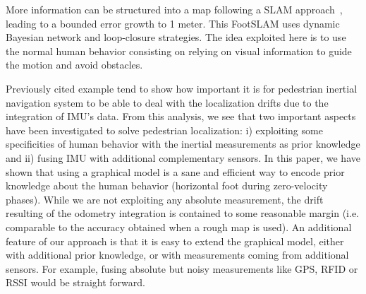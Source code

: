 More information can be structured into a map following a SLAM approach~\cite{angermann2012footslam}, leading to a bounded error growth to 1 meter. This FootSLAM uses dynamic Bayesian network and loop-closure strategies.
The idea exploited here is to use the normal human behavior 
consisting on relying on visual information to guide the motion and avoid obstacles.

Previously cited example tend to show how important it is for pedestrian inertial navigation system to be able to deal with the localization drifts due to the integration of IMU's data. 
From this analysis, we see that two important aspects have been investigated to solve pedestrian localization: i) exploiting some specificities of human behavior with the inertial measurements as prior knowledge and ii) fusing IMU with additional complementary sensors.
In this paper, we have shown that using a graphical model is a sane and efficient way to encode prior knowledge about the human behavior (horizontal foot during zero-velocity phases).
While we are not exploiting any absolute measurement, the drift resulting of the odometry integration is contained to some reasonable margin (i.e. comparable to the accuracy obtained when a rough map is used).
An additional feature of our approach is that it is easy to extend the graphical model, either with additional prior knowledge, or with measurements coming from additional sensors.
For example, fusing absolute but noisy measurements like GPS, RFID or RSSI would be straight forward.